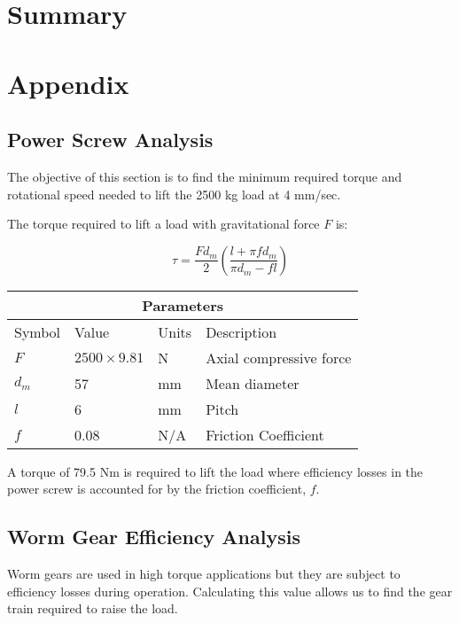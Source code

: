 \documentclass[letterpaper,12pt]{article}
\begin{document}
	\section{Summary}
	
	\newpage
	
	\section{Appendix}
	
	\subsection{Power Screw Analysis}
	
	The objective of this section is to find the minimum required torque and rotational speed needed to lift the 2500 kg load at 4 mm/sec.
	
	The torque required to lift a load with gravitational force $F$ is:
	
	\begin{equation}
	\tau = \frac{Fd_m}{2}\left(\frac{l+\pi f d_m}{\pi d_m - fl}\right)
	\end{equation}
	
	\begin{center}
		\begin{tabular}{ |p{2cm}||p{3cm}|p{2cm}|p{7cm}|  }
			\hline
			\multicolumn{4}{|c|}{Parameters} \\
			\hline
			Symbol& Value & Units & Description\\
			\hline
			$F$ & $2500 \times 9.81$ & N & Axial compressive force\\
			$d_m$ & 57 & mm   & Mean diameter\\
			$l$ & 6 & mm &  Pitch\\
			$f$ & 0.08 & N/A & Friction Coefficient\\
			\hline
		\end{tabular}
	\end{center}
	
A torque of 79.5 Nm is required to lift the load where efficiency losses in the power screw is accounted for by the friction coefficient, $f$. 

\subsection{Worm Gear Efficiency Analysis}
Worm gears are used in high torque applications but they are subject to efficiency losses during operation. Calculating this value allows us to find the gear train required to raise the load. \\
\end{document}
